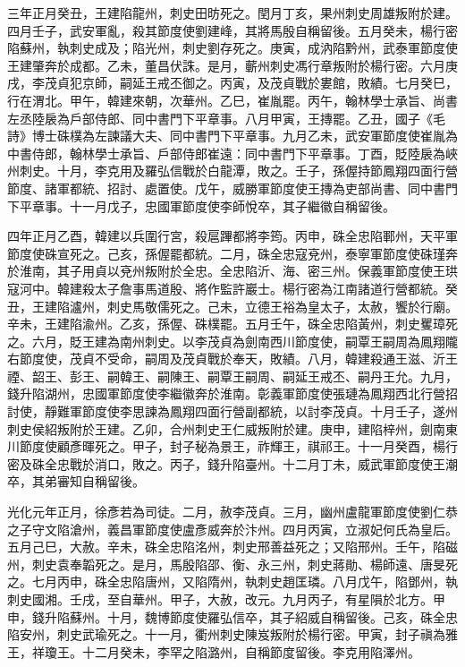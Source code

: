 \begin{pinyinscope}
 三年正月癸丑，王建陷龍州，刺史田昉死之。閏月丁亥，果州刺史周雄叛附於建。四月壬子，武安軍亂，殺其節度使劉建峰，其將馬殷自稱留後。五月癸未，楊行密陷蘇州，執刺史成及；陷光州，刺史劉存死之。庚寅，成汭陷黔州，武泰軍節度使王建肇奔於成都。乙未，董昌伏誅。是月，蘄州刺史馮行章叛附於楊行密。六月庚戌，李茂貞犯京師，嗣延王戒丕御之。丙寅，及茂貞戰於婁館，敗績。七月癸巳，行在渭北。甲午，韓建來朝，次華州。乙巳，崔胤罷。丙午，翰林學士承旨、尚書左丞陸扆為戶部侍郎、同中書門下平章事。八月甲寅，王摶罷。乙丑，國子《毛詩》博士硃樸為左諫議大夫、同中書門下平章事。九月乙未，武安軍節度使崔胤為中書侍郎，翰林學士承旨、戶部侍郎崔遠：同中書門下平章事。丁酉，貶陸扆為峽州刺史。十月，李克用及羅弘信戰於白龍潭，敗之。壬子，孫偓持節鳳翔四面行營節度、諸軍都統、招討、處置使。戊午，威勝軍節度使王摶為吏部尚書、同中書門下平章事。十一月戊子，忠國軍節度使李師悅卒，其子繼徽自稱留後。



 四年正月乙酉，韓建以兵圍行宮，殺扈蹕都將李筠。丙申，硃全忠陷鄆州，天平軍節度使硃宣死之。己亥，孫偓罷都統。二月，硃全忠寇兗州，泰寧軍節度使硃瑾奔於淮南，其子用貞以兗州叛附於全忠。全忠陷沂、海、密三州。保義軍節度使王珙寇河中。韓建殺太子詹事馬道殷、將作監許巖士。楊行密為江南諸道行營都統。癸丑，王建陷瀘州，刺史馬敬儒死之。己未，立德王裕為皇太子，太赦，饗於行廟。辛未，王建陷渝州。乙亥，孫偓、硃樸罷。五月壬午，硃全忠陷黃州，刺史矍璋死之。六月，貶王建為南州刺史。以李茂貞為劍南西川節度使，嗣覃王嗣周為鳳翔隴右節度使，茂貞不受命，嗣周及茂貞戰於奉天，敗績。八月，韓建殺通王滋、沂王禋、韶王、彭王、嗣韓王、嗣陳王、嗣覃王嗣周、嗣延王戒丕、嗣丹王允。九月，錢升陷湖州，忠國軍節度使李繼徽奔於淮南。彰義軍節度使張璉為鳳翔西北行營招討使，靜難軍節度使李思諫為鳳翔四面行營副都統，以討李茂貞。十月壬子，遂州刺史侯紹叛附於王建。乙卯，合州刺史王仁威叛附於建。庚申，建陷梓州，劍南東川節度使顧彥暉死之。甲子，封子秘為景王，祚輝王，祺祁王。十一月癸酉，楊行密及硃全忠戰於消口，敗之。丙子，錢升陷臺州。十二月丁未，威武軍節度使王潮卒，其弟審知自稱留後。



 光化元年正月，徐彥若為司徒。二月，赦李茂貞。三月，幽州盧龍軍節度使劉仁恭之子守文陷滄州，義昌軍節度使盧彥威奔於汴州。四月丙寅，立淑妃何氏為皇后。五月己巳，大赦。辛未，硃全忠陷洺州，刺史邢善益死之；又陷邢州。壬午，陷磁州，刺史袁奉韜死之。是月，馬殷陷邵、衡、永三州，刺史蔣勛、楊師遠、唐旻死之。七月丙申，硃全忠陷唐州，又陷隋州，執刺史趙匡璘。八月戊午，陷鄧州，執刺史國湘。壬戌，至自華州。甲子，大赦，改元。九月丙子，有星隕於北方。甲申，錢升陷蘇州。十月，魏博節度使羅弘信卒，其子紹威自稱留後。己亥，硃全忠陷安州，刺史武瑜死之。十一月，衢州刺史陳岌叛附於楊行密。甲寅，封子禛為雅王，祥瓊王。十二月癸未，李罕之陷潞州，自稱節度留後。李克用陷澤州。




\end{pinyinscope}

